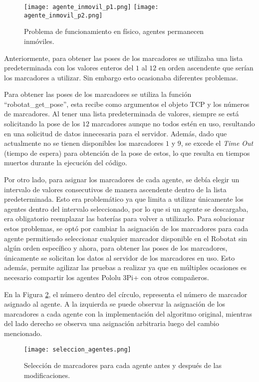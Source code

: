 \begin{figure}[H]
	\centering
	\texttt{[image: agente\_inmovil\_p1.png]}
	\texttt{[image: agente\_inmovil\_p2.png]}
	\caption{Problema de funcionamiento en físico, agentes permanecen inmóviles.}
	\label{fig:agente_inmovil}
\end{figure}

Anteriormente, para obtener las poses de los marcadores se utilizaba una lista predeterminada con los valores enteros del $1$ al $12$ en orden ascendente que serían los marcadores a utilizar. Sin embargo esto ocasionaba diferentes problemas.

Para obtener las poses de los marcadores se utiliza la función ``robotat\_get\_pose'', esta recibe como argumentos el objeto TCP y los números de marcadores. Al tener una lista predeterminada de valores, siempre se está solicitando la pose de los $12$ marcadores aunque no todos estén en uso, resultando en una solicitud de datos innecesaria para el servidor. Además, dado que actualmente no se tienen disponibles los marcadores $1$ y $9$, se excede el \textit{Time Out} (tiempo de espera) para obtención de la pose de estos, lo que resulta en tiempos muertos durante la ejecución del código.

Por otro lado, para asignar los marcadores de cada agente, se debía elegir un intervalo  de valores consecutivos de manera ascendente dentro de la lista predeterminada. Esto era problemático ya que limita a utilizar únicamente los agentes dentro del intervalo seleccionado, por lo que si un agente se descargaba, era obligatorio reemplazar las baterías para volver a utilizarlo. Para solucionar estos problemas, se optó por cambiar la asignación de los marcadores para cada agente permitiendo seleccionar cualquier marcador disponible en el Robotat sin algún orden específico y ahora, para obtener las poses de los marcadores, únicamente se solicitan los datos al servidor de los marcadores en uso. Esto además, permite agilizar las pruebas a realizar ya que en múltiples ocasiones es necesario compartir los agentes Pololu 3Pi+ con otros compañeros.

En la Figura \ref{fig:seleccion_agentes}, el número dentro del círculo, representa el número de marcador asignado al agente. A la izquierda se puede observar la asignación de los marcadores a cada agente con la implementación del algoritmo original, mientras del lado derecho se observa una asignación arbitraria luego del cambio mencionado.


\begin{figure}[H]
	\centering
	\texttt{[image: seleccion\_agentes.png]}
	\caption{Selección de marcadores para cada agente antes y después de las modificaciones.}
	\label{fig:seleccion_agentes}
\end{figure}


